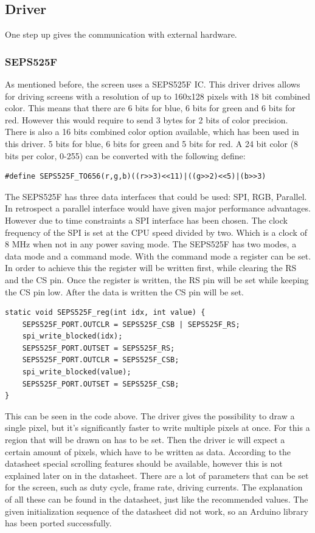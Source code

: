 \subsection{Driver}
One step up gives the communication with external hardware.
\subsubsection{SEPS525F}
As mentioned before, the screen uses a SEPS525F IC. This driver drives allows for driving screens with a resolution of up to 160x128 pixels with 18 bit combined color. This means that there are 6 bits for blue, 6 bits for green and 6 bits for red. However this would require to send 3 bytes for 2 bits of color precision. There is also a 16 bits combined color option available, which has been used in this driver. 5 bits for blue, 6 bits for green and 5 bits for red. A 24 bit color (8 bits per color, 0-255) can be converted with the following define:
\begin{verbatim}
#define SEPS525F_TO656(r,g,b)((r>>3)<<11)|((g>>2)<<5)|(b>>3)
\end{verbatim}
The SEPS525F has three data interfaces that could be used: SPI, RGB, Parallel. In retrospect a parallel interface would have given major performance advantages. However due to time constraints a SPI interface has been chosen. The clock frequency of the SPI is set at the CPU speed divided by two. Which is a clock of 8 MHz when not in any power saving mode.\newpar
The SEPS525F has two modes, a data mode and a command mode. With the command mode a register can be set. In order to achieve this the register will be written first, while clearing the RS and the CS pin. Once the register is written, the RS pin will be set while keeping the CS pin low. After the data is written the CS pin will be set.
\begin{verbatim}
static void SEPS525F_reg(int idx, int value) {
	SEPS525F_PORT.OUTCLR = SEPS525F_CSB | SEPS525F_RS;
	spi_write_blocked(idx);
	SEPS525F_PORT.OUTSET = SEPS525F_RS;
	SEPS525F_PORT.OUTCLR = SEPS525F_CSB;
	spi_write_blocked(value);
	SEPS525F_PORT.OUTSET = SEPS525F_CSB;
}
\end{verbatim}
This can be seen in the code above. The driver gives the possibility to draw a single pixel, but it's significantly faster to write multiple pixels at once. For this a region that will be drawn on has to be set. Then the driver ic will expect a certain amount of pixels, which have to be written as data. According to the datasheet special scrolling features should be available, however this is not explained later on in the datasheet. There are a lot of parameters that can be set for the screen, such as duty cycle, frame rate, driving currents. The explanation of all these can be found in the datasheet, just like the recommended values. The given initialization sequence of the datasheet did not work, so an Arduino library has been ported successfully\cite{github:oled}.

